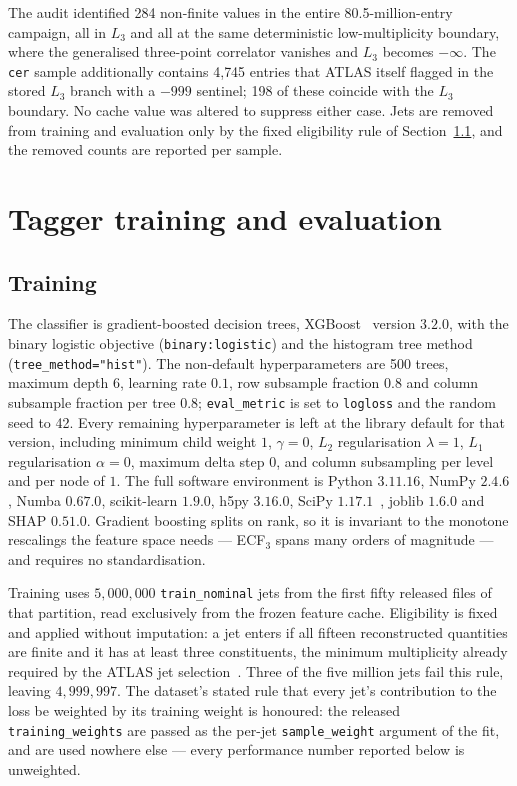 \documentclass[pdflatex,sn-mathphys,Numbered,iicol]{sn-jnl}
\begin{document}
The audit identified 284 non-finite values in the entire 80.5-million-entry campaign,
all in $L_3$ and all at the same deterministic low-multiplicity boundary, where the
generalised three-point correlator vanishes and $L_3$ becomes $-\infty$. The
\texttt{cer} sample additionally contains 4{,}745 entries that ATLAS itself flagged in
the stored $L_3$ branch with a $-999$ sentinel; 198 of these coincide with the $L_3$
boundary. No cache value was altered to suppress either case. Jets are removed from
training and evaluation only by the fixed eligibility rule of
Section~\ref{sec:training}, and the removed counts are reported per sample.

\section{Tagger training and evaluation}
\label{sec:tagger}

\subsection{Training}
\label{sec:training}

The classifier is gradient-boosted decision trees, XGBoost~\cite{Chen2016} version
$3.2.0$, with the binary logistic objective (\texttt{binary:logistic}) and the
histogram tree method (\texttt{tree\_method="hist"}). The non-default hyperparameters
are 500 trees, maximum depth 6, learning rate $0.1$, row subsample fraction $0.8$ and
column subsample fraction per tree $0.8$; \texttt{eval\_metric} is set to
\texttt{logloss} and the random seed to 42. Every remaining hyperparameter is left at
the library default for that version, including minimum child weight $1$, $\gamma = 0$,
$L_2$ regularisation $\lambda = 1$, $L_1$ regularisation $\alpha = 0$, maximum delta
step $0$, and column subsampling per level and per node of $1$. The full software
environment is Python $3.11.16$, NumPy $2.4.6$, Numba $0.67.0$, scikit-learn $1.9.0$,
h5py $3.16.0$, SciPy $1.17.1$~\cite{Virtanen2020}, joblib $1.6.0$ and SHAP $0.51.0$. Gradient boosting
splits on rank, so it is invariant to the monotone rescalings the feature space needs
--- ECF$_3$ spans many orders of magnitude --- and requires no standardisation.

Training uses $5{,}000{,}000$ \texttt{train\_nominal} jets from the first fifty
released files of that partition, read exclusively from the frozen feature cache.
Eligibility is fixed and applied without imputation: a jet enters if all fifteen
reconstructed quantities are finite and it has at least three constituents, the minimum
multiplicity already required by the ATLAS jet selection~\cite{ATLAS2024}. Three of the
five million jets fail this rule, leaving $4{,}999{,}997$. The dataset's stated rule
that every jet's contribution to the loss be weighted by its training weight is
honoured: the released \texttt{training\_weights} are passed as the per-jet
\texttt{sample\_weight} argument of the fit, and are used nowhere else --- every
performance number reported below is unweighted.
\end{document}
